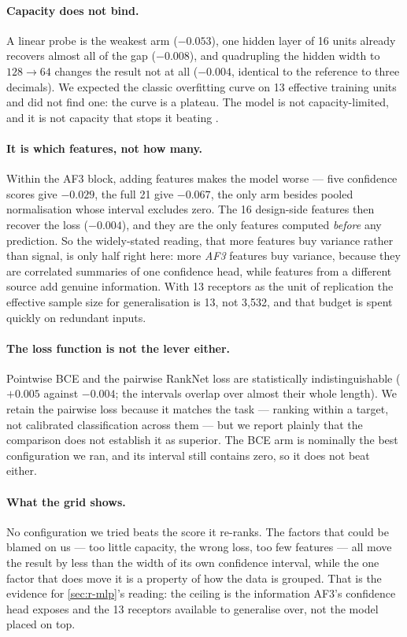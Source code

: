 \paragraph{Capacity does not bind.} A linear probe is the weakest arm ($-0.053$), one hidden
layer of 16 units already recovers almost all of the gap ($-0.008$), and quadrupling the hidden
width to $128\rightarrow64$ changes the result not at all ($-0.004$, identical to the reference
to three decimals). We expected the classic overfitting curve on 13 effective training units and
did not find one: the curve is a plateau. The model is not capacity-limited, and it is not
capacity that stops it beating \ipsaemin{}.

\paragraph{It is which features, not how many.} Within the AF3 block, adding features makes the
model worse --- five confidence scores give $-0.029$, the full 21 give $-0.067$, the only arm
besides pooled normalisation whose interval excludes zero. The 16 design-side features then
recover the loss ($-0.004$), and they are the only features computed \emph{before} any
prediction. So the widely-stated reading, that more features buy variance rather than signal, is
only half right here: more \emph{AF3} features buy variance, because they are correlated
summaries of one confidence head, while features from a different source add genuine
information. With 13 receptors as the unit of replication the effective sample size for
generalisation is 13, not 3,532, and that budget is spent quickly on redundant inputs.

\paragraph{The loss function is not the lever either.} Pointwise BCE and the pairwise RankNet
loss are statistically indistinguishable ($+0.005$ against $-0.004$; the intervals overlap over
almost their whole length). We retain the pairwise loss because it matches the task --- ranking
within a target, not calibrated classification across them --- but we report plainly that the
comparison does not establish it as superior. The BCE arm is nominally the best configuration we
ran, and its interval still contains zero, so it does not beat \ipsaemin{} either.

\paragraph{What the grid shows.} No configuration we tried beats the score it re-ranks. The
factors that could be blamed on us --- too little capacity, the wrong loss, too few features ---
all move the result by less than the width of its own confidence interval, while the one factor
that does move it is a property of how the data is grouped. That is the evidence for
\cref{sec:r-mlp}'s reading: the ceiling is the information AF3's confidence head exposes and the
13 receptors available to generalise over, not the model placed on top.
